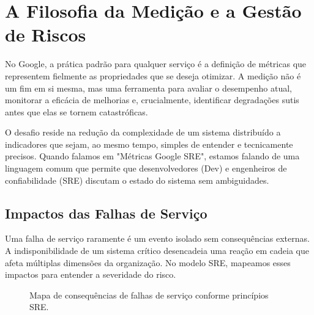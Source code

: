 \documentclass[12pt,a4paper]{report}
\begin{document}
\section{A Filosofia da Medição e a Gestão de Riscos}

No Google, a prática padrão para qualquer serviço é a definição de métricas que representem fielmente as propriedades que se deseja otimizar. A medição não é um fim em si mesma, mas uma ferramenta para avaliar o desempenho atual, monitorar a eficácia de melhorias e, crucialmente, identificar degradações sutis antes que elas se tornem catastróficas.

O desafio reside na redução da complexidade de um sistema distribuído a indicadores que sejam, ao mesmo tempo, simples de entender e tecnicamente precisos. Quando falamos em "Métricas Google SRE", estamos falando de uma linguagem comum que permite que desenvolvedores (Dev) e engenheiros de confiabilidade (SRE) discutam o estado do sistema sem ambiguidades.

\subsection{Impactos das Falhas de Serviço}

Uma falha de serviço raramente é um evento isolado sem consequências externas. A indisponibilidade de um sistema crítico desencadeia uma reação em cadeia que afeta múltiplas dimensões da organização. No modelo SRE, mapeamos esses impactos para entender a severidade do risco.

\begin{figure}[h]
    \centering
    \caption{Mapa de consequências de falhas de serviço conforme princípios SRE.}
\end{figure}
\end{document}
